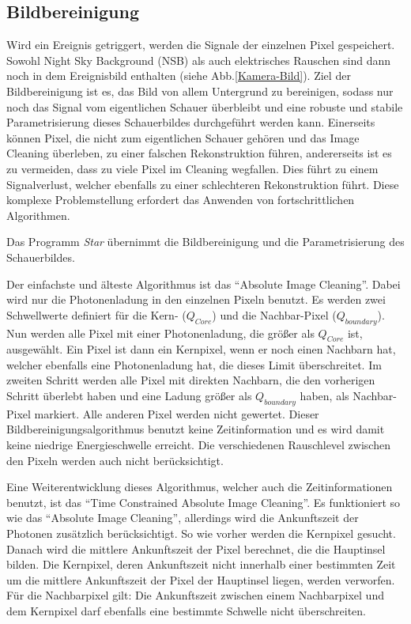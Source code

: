\subsection{Bildbereinigung}

Wird ein Ereignis getriggert, werden die Signale der einzelnen Pixel gespeichert.
Sowohl Night Sky Background (NSB) als auch elektrisches Rauschen sind dann noch in dem Ereignisbild enthalten (siehe Abb.\ref{Kamera-Bild}).
Ziel der Bildbereinigung ist es, das Bild von allem Untergrund zu bereinigen, sodass nur noch das Signal vom eigentlichen Schauer überbleibt und eine robuste und stabile Parametrisierung dieses Schauerbildes durchgeführt werden kann.
Einerseits können Pixel, die nicht zum eigentlichen Schauer gehören und das Image Cleaning überleben, zu einer falschen Rekonstruktion führen, andererseits ist es zu vermeiden, dass zu viele Pixel im Cleaning wegfallen. 
Dies führt zu einem Signalverlust, welcher ebenfalls zu einer schlechteren Rekonstruktion führt.
Diese komplexe Problemstellung erfordert das Anwenden von fortschrittlichen Algorithmen.

Das Programm \textit{Star} übernimmt die Bildbereinigung und die Parametrisierung des Schauerbildes.

Der einfachste und älteste Algorithmus ist das ``Absolute Image Cleaning''.
Dabei wird nur die Photonenladung in den einzelnen Pixeln benutzt.
Es werden zwei Schwellwerte definiert für die Kern- ($Q_{Core}$) und die Nachbar-Pixel ($Q_{boundary}$).
Nun werden alle Pixel mit einer Photonenladung, die größer als $Q_{Core}$ ist, ausgewählt.
Ein Pixel ist dann ein Kernpixel, wenn er noch einen Nachbarn hat, welcher ebenfalls eine Photonenladung hat, die dieses Limit überschreitet.
Im zweiten Schritt werden alle Pixel mit direkten Nachbarn, die den vorherigen Schritt überlebt haben und eine Ladung größer als $Q_{boundary}$ haben, als Nachbar-Pixel markiert.
Alle anderen Pixel werden nicht gewertet.
Dieser Bildbereinigungsalgorithmus benutzt keine Zeitinformation und es wird damit keine niedrige Energieschwelle erreicht. 
Die verschiedenen Rauschlevel zwischen den Pixeln werden auch nicht berücksichtigt.

Eine Weiterentwicklung dieses Algorithmus, welcher auch die Zeitinformationen benutzt, ist das ``Time Constrained Absolute Image Cleaning''. 
Es funktioniert so wie das ``Absolute Image Cleaning'', allerdings wird die Ankunftszeit der Photonen zusätzlich berücksichtigt.
So wie vorher werden die Kernpixel gesucht. 
Danach wird die mittlere Ankunftszeit der Pixel berechnet, die die Hauptinsel bilden.
Die Kernpixel, deren Ankunftszeit nicht innerhalb einer bestimmten Zeit um die mittlere Ankunftszeit der Pixel der Hauptinsel liegen, werden verworfen.
Für die Nachbarpixel gilt: Die Ankunftszeit zwischen einem Nachbarpixel und dem Kernpixel darf ebenfalls eine bestimmte Schwelle nicht überschreiten.

